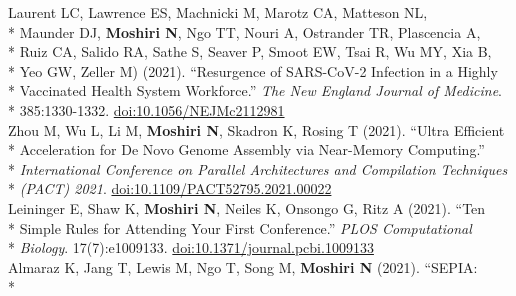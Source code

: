 \documentclass[margin,line]{res}
\begin{document}
\begin{resume}
\hspace*{9.5mm} Laurent LC, Lawrence ES, Machnicki M, Marotz CA, Matteson NL,\\*
\hspace*{9.5mm} Maunder DJ, \textbf{Moshiri N}, Ngo TT, Nouri A, Ostrander TR, Plascencia A,\\*
\hspace*{9.5mm} Ruiz CA, Salido RA, Sathe S, Seaver P, Smoot EW, Tsai R, Wu MY, Xia B,\\*
\hspace*{9.5mm} Yeo GW, Zeller M) (2021). ``Resurgence of SARS-CoV-2 Infection in a Highly\\*
\hspace*{9.5mm} Vaccinated Health System Workforce.'' \textit{The New England Journal of Medicine}.\\*\vspace{2mm}
\hspace*{8mm} 385:1330-1332. \href{https://doi.org/10.1056/NEJMc2112981}{doi:10.1056/NEJMc2112981}\\
\hspace*{4mm} Zhou M, Wu L, Li M, \textbf{Moshiri N}, Skadron K, Rosing T (2021). ``Ultra Efficient\\*
\hspace*{9.5mm} Acceleration for De Novo Genome Assembly via Near-Memory Computing.''\\*
\hspace*{9.5mm} \textit{International Conference on Parallel Architectures and Compilation Techniques}\\*\vspace{2mm}
\hspace*{8mm} \textit{(PACT) 2021}. \href{https://doi.org/10.1109/PACT52795.2021.00022}{doi:10.1109/PACT52795.2021.00022}\\
\hspace*{4mm} Leininger E, Shaw K, \textbf{Moshiri N}, Neiles K, Onsongo G, Ritz A (2021). ``Ten\\*
\hspace*{9.5mm} Simple Rules for Attending Your First Conference.'' \textit{PLOS Computational}\\*\vspace{2mm}
\hspace*{8mm} \textit{Biology}. 17(7):e1009133. \href{https://doi.org/10.1371/journal.pcbi.1009133}{doi:10.1371/journal.pcbi.1009133}\\
\hspace*{4mm} Almaraz K, Jang T, Lewis M, Ngo T, Song M, \textbf{Moshiri N} (2021). ``SEPIA:\\*

\end{resume}
\end{document}
